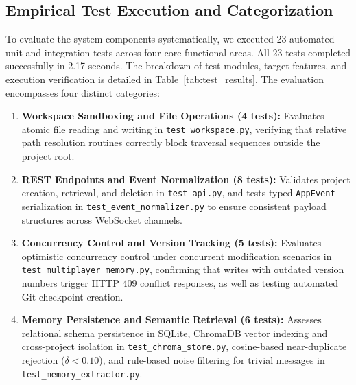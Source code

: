 \documentclass[conference]{IEEEtran}
\begin{document}
\subsection{Empirical Test Execution and Categorization}
To evaluate the system components systematically, we executed 23 automated unit and integration tests across four core functional areas. All 23 tests completed successfully in 2.17 seconds. The breakdown of test modules, target features, and execution verification is detailed in Table~\ref{tab:test_results}. The evaluation encompasses four distinct categories:
\begin{enumerate}
    \item \textbf{Workspace Sandboxing and File Operations (4 tests):} Evaluates atomic file reading and writing in \texttt{test\_workspace.py}, verifying that relative path resolution routines correctly block traversal sequences outside the project root.
    \item \textbf{REST Endpoints and Event Normalization (8 tests):} Validates project creation, retrieval, and deletion in \texttt{test\_api.py}, and tests typed \texttt{AppEvent} serialization in \texttt{test\_event\_normalizer.py} to ensure consistent payload structures across WebSocket channels.
    \item \textbf{Concurrency Control and Version Tracking (5 tests):} Evaluates optimistic concurrency control under concurrent modification scenarios in \texttt{test\_multiplayer\_memory.py}, confirming that writes with outdated version numbers trigger HTTP 409 conflict responses, as well as testing automated Git checkpoint creation.
    \item \textbf{Memory Persistence and Semantic Retrieval (6 tests):} Assesses relational schema persistence in SQLite, ChromaDB vector indexing and cross-project isolation in \texttt{test\_chroma\_store.py}, cosine-based near-duplicate rejection ($\delta < 0.10$), and rule-based noise filtering for trivial messages in \texttt{test\_memory\_extractor.py}.
\end{enumerate}
\end{document}
